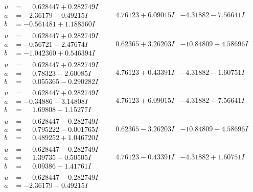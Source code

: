\documentclass[1p]{elsarticle_modified}
\theoremstyle{definition}
\begin{document}
$$\begin{array}{c|c|c}
 \hline 
\begin{aligned}
u &= \phantom{-}0.628447 + 0.282749 I \\
a &= -2.36179 + 0.49215 I \\
b &= -0.561481 + 1.188560 I\end{aligned}
 & \phantom{-}4.76123 + 6.09015 I & -4.31882 - 7.56641 I \\ \hline\begin{aligned}
u &= \phantom{-}0.628447 + 0.282749 I \\
a &= -0.56721 + 2.47674 I \\
b &= -1.042360 + 0.546394 I\end{aligned}
 & \phantom{-}0.62365 + 3.26203 I & -10.84809 - 4.58696 I \\ \hline\begin{aligned}
u &= \phantom{-}0.628447 + 0.282749 I \\
a &= \phantom{-}0.78323 - 2.60085 I \\
b &= \phantom{-}0.055365 - 0.290282 I\end{aligned}
 & \phantom{-}4.76123 + 0.43391 I & -4.31882 - 1.60751 I \\ \hline\begin{aligned}
u &= \phantom{-}0.628447 + 0.282749 I \\
a &= -0.34886 - 3.14808 I \\
b &= \phantom{-}1.69808 - 1.15277 I\end{aligned}
 & \phantom{-}4.76123 + 6.09015 I & -4.31882 - 7.56641 I \\ \hline\begin{aligned}
u &= \phantom{-}0.628447 - 0.282749 I \\
a &= \phantom{-}0.795222 - 0.001765 I \\
b &= \phantom{-}0.489252 + 1.046720 I\end{aligned}
 & \phantom{-}0.62365 - 3.26203 I & -10.84809 + 4.58696 I \\ \hline\begin{aligned}
u &= \phantom{-}0.628447 - 0.282749 I \\
a &= \phantom{-}1.39735 + 0.50505 I \\
b &= \phantom{-}0.09386 - 1.41761 I\end{aligned}
 & \phantom{-}4.76123 - 0.43391 I & -4.31882 + 1.60751 I \\ \hline\begin{aligned}
u &= \phantom{-}0.628447 - 0.282749 I \\
a &= -2.36179 - 0.49215 I \\

\end{aligned}
\end{array}$$
\end{document}
